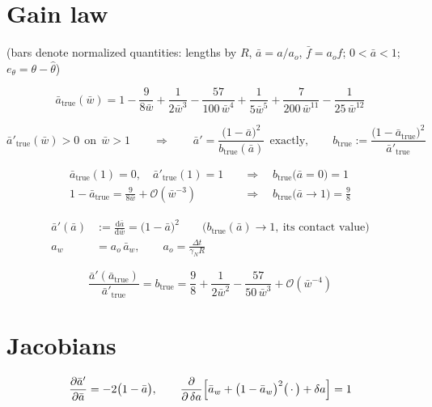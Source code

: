 \documentclass[11pt,a4paper,fontset=none]{ctexart}
\newcommand{\ba}{\bar{a}}
\newcommand{\bw}{\bar{w}}
\begin{document}
\section{Gain law}

(bars denote normalized quantities: lengths by $R$, $\ba = a/a_o$,
$\bar{f} = a_o f$; $0 < \ba < 1$; $e_{\theta} = \theta - \hat{\theta}$)

\begin{equation*}
\ba_{\mathrm{true}}(\bw) = 1 - \frac{9}{8\bw} + \frac{1}{2\bw^{3}}
  - \frac{57}{100\,\bw^{4}} + \frac{1}{5\bw^{5}}
  + \frac{7}{200\,\bw^{11}} - \frac{1}{25\,\bw^{12}}
\end{equation*}

\begin{equation*}
\ba'_{\mathrm{true}}(\bw) > 0 \ \ \text{on} \ \ \bw > 1
\qquad\Longrightarrow\qquad
\ba' = \frac{\bigl(1-\ba\bigr)^{2}}{b_{\mathrm{true}}(\ba)}
\ \ \text{exactly},
\qquad
b_{\mathrm{true}} := \frac{\bigl(1-\ba_{\mathrm{true}}\bigr)^{2}}
  {\ba'_{\mathrm{true}}}
\end{equation*}

\begin{align*}
\ba_{\mathrm{true}}(1) = 0, \quad \ba'_{\mathrm{true}}(1) = 1
  &\quad\Longrightarrow\quad b_{\mathrm{true}}\bigl(\ba = 0\bigr) = 1 \\
1 - \ba_{\mathrm{true}} = \frac{9}{8\bw} + \mathcal{O}(\bw^{-3})
  &\quad\Longrightarrow\quad b_{\mathrm{true}}\bigl(\ba \to 1\bigr) = \frac{9}{8}
\end{align*}

\begin{align*}
\ba'(\ba) &:= \frac{\mathrm{d}\ba}{\mathrm{d}\bw} = \bigl(1-\ba\bigr)^{2}
  \qquad \bigl(b_{\mathrm{true}}(\ba) \to 1, \ \text{its contact value}\bigr) \\
a_w &= a_o\,\ba_w , \qquad a_o = \frac{\Delta t}{\gamma_N R}
\end{align*}

\begin{equation*}
\frac{\ba'(\ba_{\mathrm{true}})}{\ba'_{\mathrm{true}}}
  = b_{\mathrm{true}}
  = \frac{9}{8} + \frac{1}{2\bw^{2}} - \frac{57}{50\,\bw^{3}}
  + \mathcal{O}(\bw^{-4})
\end{equation*}

\section{Jacobians}

\begin{equation*}
\frac{\partial \ba'}{\partial \ba} = -2\bigl(1-\ba\bigr),
\qquad
\frac{\partial}{\partial\,\delta a}
\Bigl[\ba_w + \bigl(1-\ba_w\bigr)^{2}\bigl(\,\cdot\,\bigr) + \delta a\Bigr] = 1
\end{equation*}
\end{document}
